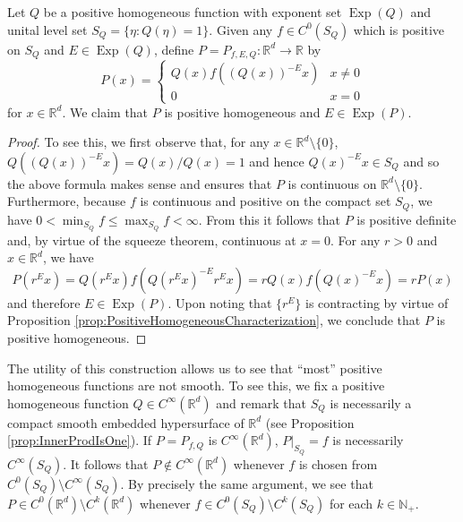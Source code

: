 \documentclass[11pt, letter]{book}
\newenvironment{example}
  {\pushQED{\qed}\renewcommand{\qedsymbol}{$\triangle$}\examplex}
  {\popQED\endexamplex}
\newcommand*{\myproofname}{Proof}
\newenvironment{subproof}[1][\myproofname]{\begin{proof}[#1]\renewcommand*{\qedsymbol}{$\mathbin{/\mkern-6mu/}$}}{\end{proof}}
\newcommand\Exp{\operatorname{Exp}}
\begin{document}
\begin{example}\label{exp:Weierstrass}\normalfont
Let $Q$ be a positive homogeneous function with exponent set $\Exp(Q)$ and unital level set $S_Q=\{\eta:Q(\eta)=1\}$. Given any $f\in C^0(S_Q)$ which is positive on $S_Q$ and $E\in \Exp(Q)$, define $P=P_{f,E,Q}:\mathbb{R}^d\to\mathbb{R}$ by
\begin{equation*}
P(x)=\begin{cases}
Q(x)f\left((Q(x))^{-E}x\right) & x\neq 0\\
0 & x=0
\end{cases}
\end{equation*}
for $x\in\mathbb{R}^d$. We claim that $P$ is positive homogeneous and $E\in\Exp(P)$.

\begin{subproof}To see this, we first observe that, for any $x\in\mathbb{R}^d\setminus \{0\}$, $Q((Q(x))^{-E}x)=Q(x)/Q(x)=1$ and hence $Q(x)^{-E}x\in S_Q$ and so the above formula makes sense and ensures that $P$ is continuous on $\mathbb{R}^d\setminus\{0\}$. Furthermore, because $f$ is continuous and positive on the compact set $S_Q$, we have $0<\min_{S_Q} f\leq \max_{S_Q} f<\infty$. From this it follows that $P$ is positive definite and, by virtue of the squeeze theorem, continuous at $x=0$. For any $r>0$ and $x\in\mathbb{R}^d$, we have
\begin{equation*}
P(r^Ex)=Q(r^Ex)f(Q(r^Ex)^{-E}r^Ex)=rQ(x)f(Q(x)^{-E}x)=rP(x)
\end{equation*}
and therefore $E\in\Exp(P)$. Upon noting that $\{r^E\}$ is contracting by virtue of Proposition \ref{prop:PositiveHomogeneousCharacterization}, we conclude that $P$ is positive homogeneous.
\end{subproof}
\noindent The utility of this construction allows us to see that ``most'' positive homogeneous functions are not smooth. To see this, we fix a positive homogeneous function $Q\in C^{\infty}(\mathbb{R}^d)$ and remark that $S_Q$ is necessarily a compact smooth embedded hypersurface of $\mathbb{R}^d$ (see Proposition \ref{prop:InnerProdIsOne}). If $P=P_{f,Q}$ is $C^\infty(\mathbb{R}^d)$, $P\vert_{S_Q}=f$ is necessarily $C^\infty(S_Q)$. It follows that $P\notin C^\infty(\mathbb{R}^d)$ whenever $f$ is chosen from $C^0(S_Q)\setminus C^\infty(S_Q)$. By precisely the same argument, we see that $P\in C^0(\mathbb{R}^d)\setminus C^k(\mathbb{R}^d)$ whenever $f\in C^0(S_Q)\setminus C^k(S_Q)$ for each $k\in\mathbb{N}_+$.\\


\end{example}
\end{document}
